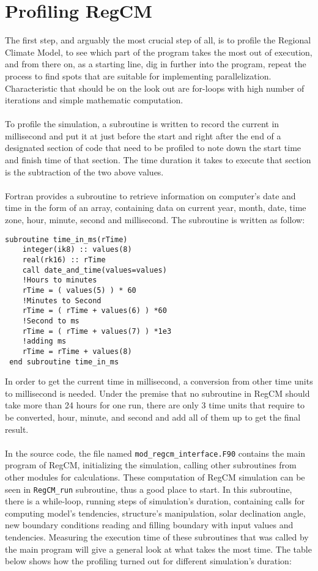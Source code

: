 \section{Profiling RegCM}
The first step, and arguably the most crucial step of all, is to profile the Regional Climate Model, to see which part of the program takes the most out of execution, and from there on, as a starting line, dig in further into the program, repeat the process to find spots that are suitable for implementing parallelization. Characteristic that should be on the look out are for-loops with high number of iterations and simple mathematic computation. \\
~\\
To profile the simulation, a subroutine is written to record the current in millisecond and put it at just before the start and right after the end of a designated section of code that need to be profiled to note down the start time and finish time of that section. The time duration it takes to execute that section is the subtraction of the two above values. \\
~\\
Fortran provides a subroutine to retrieve information on computer's date and time in the form of an array, containing data on current year, month, date, time zone, hour, minute, second and millisecond. The subroutine is written as follow:
\begin{center}
\begin{BVerbatim}
subroutine time_in_ms(rTime)
    integer(ik8) :: values(8)
    real(rk16) :: rTime
    call date_and_time(values=values)
    !Hours to minutes  
    rTime = ( values(5) ) * 60
    !Minutes to Second
    rTime = ( rTime + values(6) ) *60
    !Second to ms 
    rTime = ( rTime + values(7) ) *1e3
    !adding ms 
    rTime = rTime + values(8)
 end subroutine time_in_ms
\end{BVerbatim}
\end{center}
In order to get the current time in millisecond, a conversion from other time units to millisecond is needed. Under the premise that no subroutine in RegCM should take more than 24 hours for one run, there are only 3 time units that require to be converted, hour, minute, and second and add all of them up to get the final result.  \\
~\\
In the source code, the file named \verb|mod_regcm_interface.F90| contains the main program of RegCM, initializing the simulation, calling other subroutines from other modules for calculations. These computation of RegCM simulation can be seen in \verb|RegCM_run| subroutine, thus a good place to start. In this subroutine, there is a while-loop, running steps of simulation's duration, containing calls for computing model's tendencies, structure's manipulation, solar declination angle, new boundary conditions reading and filling boundary with input values and tendencies. Measuring the execution time of these subroutines that was called by the main program will give a general look at what takes the most time. The table below shows how the profiling turned out for different simulation's duration: \\
